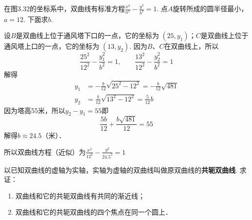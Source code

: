 \begin{solution}
在图3.32的坐标系中，双曲线有标准方程$\frac{x^2}{a^2}-\frac{y^2}{b^2}=1$. 
点$A$旋转所成的圆半径最小，$a=12$. 下面求$b$.

设$B$是双曲线上位于通风塔下口的一点，它的坐标为
$(25,y_1)$；$C$是双曲线上位于通风塔上口的一点，它的坐标为
$(13,y_2)$. 因为$B$、$C$在双曲线上，所以
\[\frac{25^2}{12^2}-\frac{y^2_1}{b^2}=1,\qquad \frac{13^2}{12^2}-\frac{y^2_2}{b^2}=1\]
解得
\[\begin{split}
    y_1&=-\frac{b}{12}\sqrt{25^2-12^2}=-\frac{b}{12}\sqrt{481}\\
    y_2&=\frac{b}{12}\sqrt{13^2-12^2}=\frac{5}{12}b
\end{split}\]
因为塔高55米，所以$y_2-y_1=55$即
\[\frac{5b}{12}+\frac{b\sqrt{481}}{12}=55\]
解得$b\approx 24.5$（米）．

所以双曲线方程（近似）为$\frac{x^2}{12^2}-\frac{y^2}{24.5^2}=1$
\end{solution}


\begin{example}
    以已知双曲线的虚轴为实轴，实轴为虚轴的双曲线叫做原双曲线的\textbf{共轭双曲线}. 求证：
\begin{enumerate}[(1)]
\item 双曲线和它的共轭双曲线有共同的渐近线；
\item 双曲线和它的共轭双曲线的四个焦点在同一个圆上．
\end{enumerate}
\end{example}

